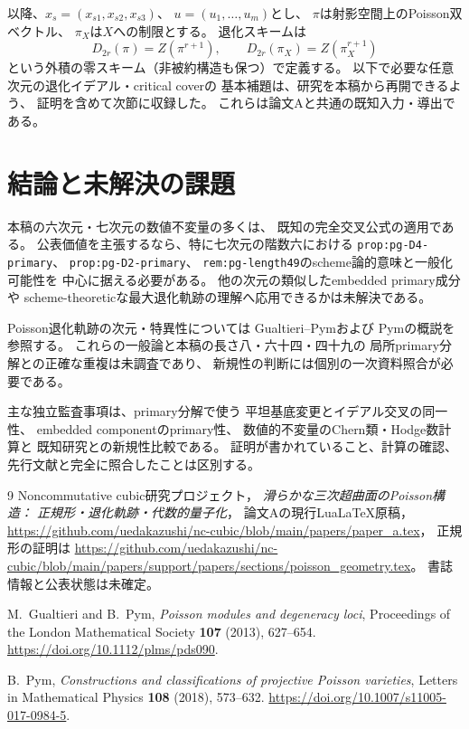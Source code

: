 \documentclass[11pt,a4paper]{ltjsarticle}
\numberwithin{equation}{section}
\begin{document}
以降、$x_s=(x_{s1},x_{s2},x_{s3})$、
$u=(u_1,\ldots,u_m)$とし、
$\pi$は射影空間上のPoisson双ベクトル、
$\pi_X$は$X$への制限とする。
退化スキームは
\begin{equation}
 D_{2r}(\pi)=Z(\pi^{r+1}),\qquad
 D_{2r}(\pi_X)=Z(\pi_X^{r+1})
 \label{eq:input-degeneracy}
\end{equation}
という外積の零スキーム（非被約構造も保つ）で定義する。
以下で必要な任意次元の退化イデアル・critical coverの
基本補題は、研究を本稿から再開できるよう、
証明を含めて次節に収録した。
これらは論文Aと共通の既知入力・導出である。





\section{結論と未解決の課題}
本稿の六次元・七次元の数値不変量の多くは、
既知の完全交叉公式の適用である。
公表価値を主張するなら、特に七次元の階数六における
\texttt{prop:pg-D4-primary}、
\texttt{prop:pg-D2-primary}、
\texttt{rem:pg-length49}のscheme論的意味と一般化可能性を
中心に据える必要がある。
他の次元の類似したembedded primary成分や
scheme-theoreticな最大退化軌跡の理解へ応用できるかは未解決である。

Poisson退化軌跡の次元・特異性については
Gualtieri--Pym\cite{GualtieriPymDeg}および
Pymの概説\cite{PymProjectivePoisson}を参照する。
これらの一般論と本稿の長さ八・六十四・四十九の
局所primary分解との正確な重複は未調査であり、
新規性の判断には個別の一次資料照合が必要である。

主な独立監査事項は、primary分解で使う
平坦基底変更とイデアル交叉の同一性、
embedded componentのprimary性、
数値的不変量のChern類・Hodge数計算と
既知研究との新規性比較である。
証明が書かれていること、計算の確認、
先行文献と完全に照合したことは区別する。

\begin{thebibliography}{9}
Noncommutative cubic研究プロジェクト，
\emph{滑らかな三次超曲面のPoisson構造：
正規形・退化軌跡・代数的量子化}，
論文Aの現行LuaLaTeX原稿，
\url{https://github.com/uedakazushi/nc-cubic/blob/main/papers/paper_a.tex}，
正規形の証明は
\url{https://github.com/uedakazushi/nc-cubic/blob/main/papers/support/papers/sections/poisson_geometry.tex}。
書誌情報と公表状態は未確定。

M.~Gualtieri and B.~Pym,
\emph{Poisson modules and degeneracy loci},
Proceedings of the London Mathematical Society
\textbf{107} (2013), 627--654.
\url{https://doi.org/10.1112/plms/pds090}.

B.~Pym,
\emph{Constructions and classifications of projective Poisson varieties},
Letters in Mathematical Physics \textbf{108} (2018), 573--632.
\url{https://doi.org/10.1007/s11005-017-0984-5}.
\end{thebibliography}
\end{document}
